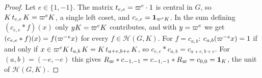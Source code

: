 \begin{theorem}
\end{theorem}
\begin{proof}
Let $e\in\{1,-1\}$. The matrix $t_{e,e}=\varpi^e\cdot1$ is central in $G$, so $K\,t_{e,e}\,K=\varpi^eK$, a single left
coset, and $c_{e,e}=\mathbf 1_{\varpi^eK}$. In the sum defining $(c_{e,e}*f)(x)$ only $yK=\varpi^eK$ contributes, and
with $y=\varpi^e$ we get $(c_{e,e}*f)(x)=f(\varpi^{-e}x)$ for every $f\in\mathcal H(G,K)$. For $f=c_{a,b}$:
$c_{a,b}(\varpi^{-e}x)=1$ if and only if $x\in\varpi^eK\,t_{a,b}\,K=K\,t_{a+e,b+e}\,K$, so $c_{e,e}*c_{a,b}=c_{a+e,b+e}$.
For $(a,b)=(-e,-e)$ this gives $R_\varpi*c_{-1,-1}=c_{-1,-1}*R_\varpi=c_{0,0}=\mathbf 1_K$, the unit of
$\mathcal H(G,K)$.
\end{proof}

